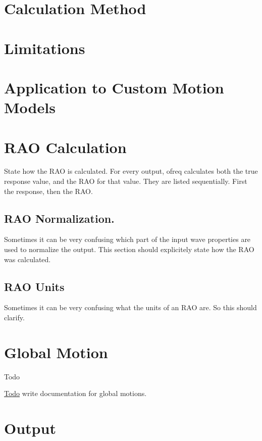 \section*{Calculation Method}

\section*{Limitations}

\section*{Application to Custom Motion Models}

\section*{R\-A\-O Calculation}

State how the R\-A\-O is calculated. For every output, ofreq calculates both the true response value, and the R\-A\-O for that value. They are listed sequentially. First the response, then the R\-A\-O.

\subsection*{R\-A\-O Normalization.}

Sometimes it can be very confusing which part of the input wave properties are used to normalize the output. This section should explicitely state how the R\-A\-O was calculated.

\subsection*{R\-A\-O Units}

Sometimes it can be very confusing what the units of an R\-A\-O are. So this should clarify. \hypertarget{global_motion}{}\section{Global Motion}\label{global_motion}
\begin{DoxyRefDesc}{Todo}
\item[\hyperlink{todo__todo000015}{Todo}]write documentation for global motions.\end{DoxyRefDesc}


\section*{Output}

